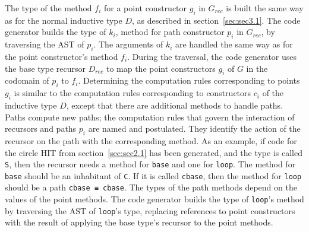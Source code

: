\documentclass[runningheads]{llncs}
\begin{document}
The type of the method $f_i$ for a point constructor $g_i$ in $G_{rec}$ is built the same way as for the normal inductive type $D$, as described in section~\ref{sec:sec3.1}.
The code generator builds the type of $k_i$, method for path constructor $p_i$ in $G_{rec}$, by traversing the AST of $p_i$. The arguments of $k_i$ are handled the same way as for the point constructor's method $f_i$. During the traversal, the code generator uses the base type recursor $D_{rec}$ to map the point constructors $g_i$ of $G$ in the codomain of $p_i$ to $f_i$. Determining the computation rules corresponding to points $g_i$ is similar to the computation rules corresponding to constructors $c_i$ of the inductive type $D$, except that there are additional methods to handle paths. Paths compute new paths; the computation rules that govern the interaction of recursors and paths $p_i$ are named and postulated. They identify the action of the recursor on the path with the corresponding method.
As an example, if code for the circle HIT from section~\ref{sec:sec2.1} has been generated, and the type is called \texttt{S}, then the recursor needs a method for \texttt{base} and one for \texttt{loop}.
The method for \texttt{base} should be an inhabitant of \texttt{C}.
If it is called \texttt{cbase}, then the method for \texttt{loop} should be a path \texttt{cbase ≡ cbase}.
The types of the path methods depend on the values of the point methods.
The code generator builds the type of \texttt{loop}'s method by traversing the AST of \texttt{loop}'s type,
replacing references to point constructors with the result of applying the base type's recursor to the point methods.
\end{document}
